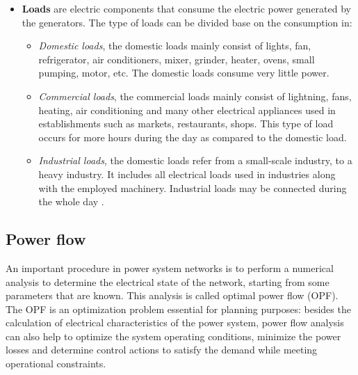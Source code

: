 \begin{itemize}
    \item \textbf{Loads} are electric components that consume the electric power generated by the generators. The type of loads can be divided base on the consumption in:
    \begin{itemize}
        \item[] \emph{Domestic loads}, the domestic loads mainly consist of lights, fan, refrigerator, air conditioners, mixer, grinder, heater, ovens, small pumping, motor, etc. The domestic loads consume very little power.
        \item[] \emph{Commercial loads}, the commercial loads mainly consist of lightning, fans, heating, air conditioning and many other electrical appliances used in establishments such as markets, restaurants, shops. This type of load occurs for more hours during the day as compared to the domestic load.
        \item[] \emph{Industrial loads}, the domestic loads refer from a small-scale industry, to a heavy industry. It includes all electrical loads used in industries along with the employed machinery. Industrial loads may be connected during the whole day \cite{EDNdesign}.
    \end{itemize}
\end{itemize}

\subsection{Power flow}
\label{powerflow}
An important procedure in power system networks is to perform a numerical analysis to determine the electrical state of the network, starting from some parameters that are known. This analysis is called optimal power flow (\gls{OPF}).\\
The \gls{OPF} is an optimization problem essential for planning purposes: besides the calculation of electrical characteristics of the power system, power flow analysis can also help to optimize the system operating conditions, minimize the power losses and determine control actions to satisfy the demand while meeting operational constraints.

